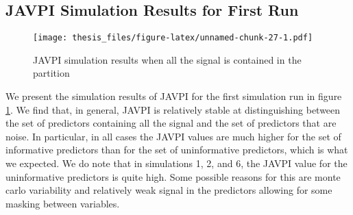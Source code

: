 \documentclass[12pt,twoside]{reedthesis}
\theoremstyle{definition}
\theoremstyle{definition}
\theoremstyle{definition}
\theoremstyle{remark}
\begin{document}
\subsection{JAVPI Simulation Results for First
Run}\label{javpi-simulation-results-for-first-run}
\begin{figure}
\centering
\texttt{[image: thesis\_files/figure-latex/unnamed-chunk-27-1.pdf]}
\caption{\label{fig:unnamed-chunk-27}\label{JAVPIonesig}JAVPI simulation
results when all the signal is contained in the partition}
\end{figure}
We present the simulation results of JAVPI for the first simulation run
in figure \ref{JAVPIonesig}. We find that, in general, JAVPI is
relatively stable at distinguishing between the set of predictors
containing all the signal and the set of predictors that are noise. In
particular, in all cases the JAVPI values are much higher for the set of
informative predictors than for the set of uninformative predictors,
which is what we expected. We do note that in simulations 1, 2, and 6,
the JAVPI value for the uninformative predictors is quite high. Some
possible reasons for this are monte carlo variability and relatively
weak signal in the predictors allowing for some masking between
variables. \par 
\end{document}
